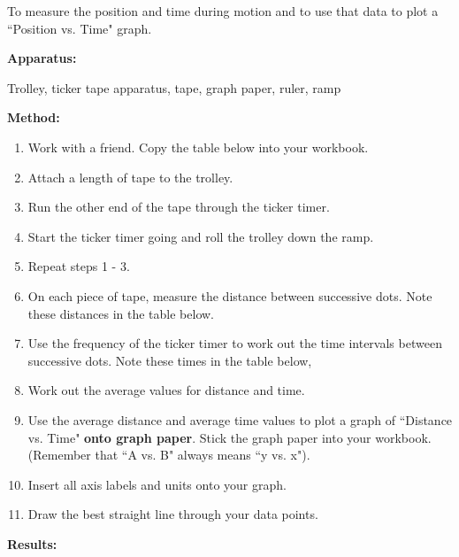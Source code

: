 To measure the position and time during motion and to use that data to plot a ``Position vs. Time" graph.\par 
        \label{m38795*id71236}\noindent{}\textbf{Apparatus:}
          
Trolley, ticker tape apparatus, tape, graph paper, ruler, ramp\par 
        \label{m38795*id713131}\noindent{}\textbf{Method:}
          
        \label{m38795*id713199}\begin{enumerate}[noitemsep, label=\textbf{\arabic*}. ] 
            \label{m38795*id1972}\item Work with a friend. Copy the table below into your workbook.
\label{m38795*uid1051}\item Attach a length of tape to the trolley.
\label{m38795*id7254233}\item Run the other end of the tape through the ticker timer.
\label{m38795*id76313512}\item Start the ticker timer going and roll the trolley down the ramp.
\label{m38795*uid14402}\item Repeat steps 1 - 3.
\label{m38795*uid10333}\item On each piece of tape, measure the distance between successive dots. Note these distances in the table below.
\label{m38795*id752232}\item Use the frequency of the ticker timer to work out the time intervals between successive dots. Note these times in the table below,
\label{m38795*id614396}\item Work out the average values for distance and time. 
\label{m38795*uid13404}\item Use the average distance and average time values to plot a graph of ``Distance vs. Time" \textbf{onto graph paper}. Stick the graph paper into your workbook. (Remember that ``A vs. B" always means ``y vs. x").
\label{m38795*uid10584}\item Insert all axis labels and units onto your graph.
\label{m38795*uid10653}\item Draw the best straight line through your data points.
\end{enumerate}
        \par 
        \label{m38795*id7141045}
          \textbf{Results:}
        \par 
        
    
